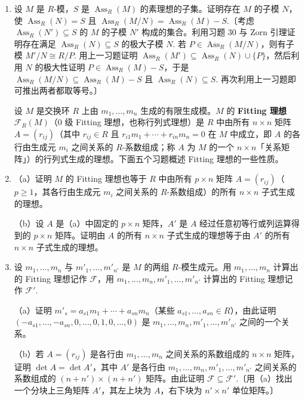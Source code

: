 \begin{enumerate}
\item 设 \(M\) 是 \(R\)-模，\(S\) 是 \(\operatorname{Ass}_R(M)\) 的素理想的子集。证明存在 \(M\) 的子模 \(N\)，使 \(\operatorname{Ass}_R(N) = S\) 且 \(\operatorname{Ass}_R(M/N) = \operatorname{Ass}_R(M)-S\).〔考虑 \(\operatorname{Ass}_R(N') \subseteq S\) 的 \(M\) 的子模 \(N'\) 构成的集合。利用习题 30 与 Zorn 引理证明存在满足 \(\operatorname{Ass}_R(N) \subseteq S\) 的极大子模 \(N\). 若 \(P \in \operatorname{Ass}_R(M/N)\)，则有子模 \(M'/N \cong R/P\). 用上一习题证明 \(\operatorname{Ass}_R(M') \subseteq \operatorname{Ass}_R(N) \cup \{P\}\)，然后利用 \(N\) 的极大性证明 \(P \in \operatorname{Ass}_R(M)-S\)，于是 \(\operatorname{Ass}_R(M/N) \subseteq \operatorname{Ass}_R(M)-S\) 且 \(\operatorname{Ass}_R(N) \subseteq S\). 再次利用上一习题即可推出两者都取等号。〕

\noindent 设 \(M\) 是交换环 \(R\) 上由 \(m_1, \ldots, m_n\) 生成的有限生成模。\(M\) 的 \textbf{Fitting 理想} \(\mathcal{F}_R(M)\)（0 级 Fitting 理想，也称行列式理想）是 \(R\) 中由所有 \(n \times n\) 矩阵 \(A = (r_{ij})\)（其中 \(r_{ij} \in R\) 且 \(r_{i1}m_1+\cdots+r_{in}m_n = 0\) 在 \(M\) 中成立，即 \(A\) 的各行由生成元 \(m_i\) 之间关系的 \(R\)-系数组成；称 \(A\) 为 \(M\) 的一个 \(n \times n\)「关系矩阵」）的行列式生成的理想。下面五个习题概述 Fitting 理想的一些性质。

\item （a）证明 \(M\) 的 Fitting 理想也等于 \(R\) 中由所有 \(p \times n\) 矩阵 \(A = (r_{ij})\)（\(p \geq 1\)，其各行由生成元 \(m_i\) 之间关系的 \(R\)-系数组成）的所有 \(n \times n\) 子式生成的理想。

（b）设 \(A\) 是（a）中固定的 \(p \times n\) 矩阵，\(A'\) 是 \(A\) 经过任意初等行或列运算得到的 \(p \times n\) 矩阵。证明由 \(A\) 的所有 \(n \times n\) 子式生成的理想等于由 \(A'\) 的所有 \(n \times n\) 子式生成的理想。

\item 设 \(m_1, \ldots, m_n\) 与 \(m'_1, \ldots, m'_{n'}\) 是 \(M\) 的两组 \(R\)-模生成元。用 \(m_1, \ldots, m_n\) 计算出的 Fitting 理想记作 \(\mathcal{F}\)，用 \(m_1, \ldots, m_n, m'_1, \ldots, m'_{n'}\) 计算出的 Fitting 理想记作 \(\mathcal{F}'\).

（a）证明 \(m'_s = a_{s1}m_1+\cdots+a_{sn}m_n\)（某些 \(a_{s1}, \ldots, a_{sn} \in R\)），由此证明 \((-a_{s1}, \ldots, -a_{sn}, 0, \ldots, 0, 1, 0, \ldots, 0)\) 是 \(m_1, \ldots, m_n, m'_1, \ldots, m'_{n'}\) 之间的一个关系。

（b）若 \(A = (r_{ij})\) 是各行由 \(m_1, \ldots, m_n\) 之间关系的系数组成的 \(n \times n\) 矩阵，证明 \(\det A = \det A'\)，其中 \(A'\) 是各行由 \(m_1, \ldots, m_n, m'_1, \ldots, m'_{n'}\) 之间关系的系数组成的 \((n+n') \times (n+n')\) 矩阵。由此证明 \(\mathcal{F} \subseteq \mathcal{F}'\).〔用（a）找出一个分块上三角矩阵 \(A'\)，其左上块为 \(A\)，右下块为 \(n' \times n'\) 单位矩阵。〕


\end{enumerate}
